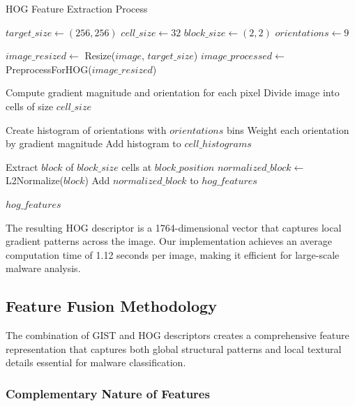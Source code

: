 \begin{algorithm}[!htbp]
\caption{HOG Feature Extraction Process}
\label{alg:hog-implementation}
\begin{algorithmic}[1]
    \State $target\_size \leftarrow (256, 256)$ 
    \State $cell\_size \leftarrow 32$ 
    \State $block\_size \leftarrow (2, 2)$ 
    \State $orientations \leftarrow 9$ 
    
    \State $image\_resized \leftarrow$ Resize($image$, $target\_size$)
    \State $image\_processed \leftarrow$ PreprocessForHOG($image\_resized$)
    
    \State Compute gradient magnitude and orientation for each pixel
    \State Divide image into cells of size $cell\_size$
    
        \State Create histogram of orientations with $orientations$ bins
        \State Weight each orientation by gradient magnitude
        \State Add histogram to $cell\_histograms$
    \EndFor
    
        \State Extract $block$ of $block\_size$ cells at $block\_position$
        \State $normalized\_block \leftarrow$ L2Normalize($block$)
        \State Add $normalized\_block$ to $hog\_features$
    \EndFor
    
    \Return $hog\_features$ 
\EndProcedure
\end{algorithmic}
\end{algorithm}

The resulting HOG descriptor is a 1764-dimensional vector that captures local gradient patterns across the image. Our implementation achieves an average computation time of 1.12 seconds per image, making it efficient for large-scale malware analysis.

\subsection{Feature Fusion Methodology}
\label{subsec:feature-fusion}

The combination of GIST and HOG descriptors creates a comprehensive feature representation that captures both global structural patterns and local textural details essential for malware classification.

\subsubsection{Complementary Nature of Features}


